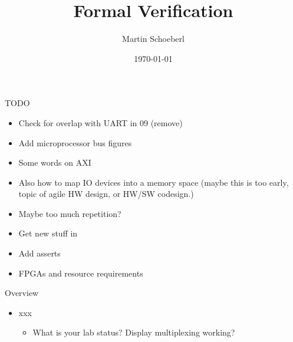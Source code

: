 

\newif\ifbook


\title{Formal Verification}
\author{Martin Schoeberl}
\date{\today}



\begin{frame}
\titlepage
\end{frame}

\begin{frame}[fragile]{TODO}
\begin{itemize}
\item Check for overlap with UART in 09 (remove)
\item Add microprocessor bus figures
\item Some words on AXI
\item Also how to map IO devices into a memory space (maybe this is too early, topic of agile HW design, or HW/SW codesign.)
\item Maybe too much repetition?
\item Get new stuff in
\item Add asserts
\item FPGAs and resource requirements
\end{itemize}
\end{frame}


\begin{frame}[fragile]{Overview}
\begin{itemize}
\item xxx
\begin{itemize}
\item What is your lab status? Display multiplexing working?
\end{itemize}
\end{itemize}
\end{frame}


